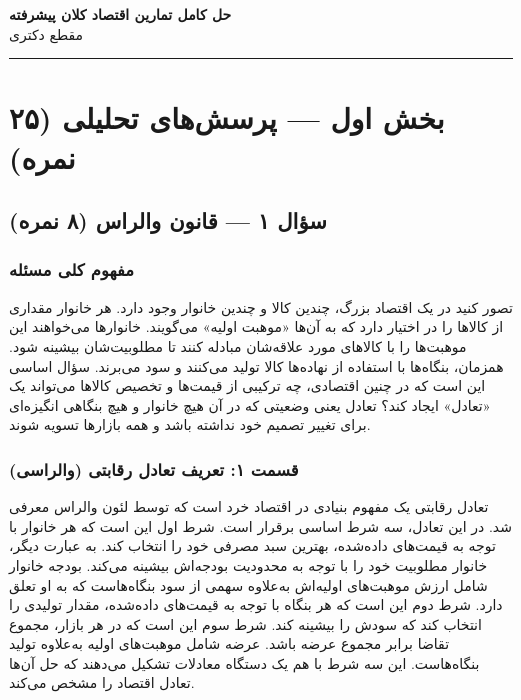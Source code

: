 \documentclass[12pt,a4paper]{article}
\begin{document}
\begin{center}
	{\Huge\bfseries\color{mainblue} حل کامل تمارین اقتصاد کلان پیشرفته}\\[0.5cm]
	{\large\color{darkgreen} مقطع دکتری}\\[0.3cm]
	{\color{mainblue}\rule{\textwidth}{1.5pt}}
\end{center}

\tableofcontents
\newpage

\section{بخش اول — پرسش‌های تحلیلی (۲۵ نمره)}

\subsection{سؤال ۱ — قانون والراس (۸ نمره)}

\subsubsection*{مفهوم کلی مسئله}

تصور کنید در یک اقتصاد بزرگ، چندین کالا و چندین خانوار وجود دارد. هر خانوار مقداری از کالاها را در اختیار دارد که به آن‌ها «موهبت اولیه» می‌گویند. خانوارها می‌خواهند این موهبت‌ها را با کالاهای مورد علاقه‌شان مبادله کنند تا مطلوبیت‌شان بیشینه شود. همزمان، بنگاه‌ها با استفاده از نهاده‌ها کالا تولید می‌کنند و سود می‌برند. سؤال اساسی این است که در چنین اقتصادی، چه ترکیبی از قیمت‌ها و تخصیص کالاها می‌تواند یک «تعادل» ایجاد کند؟ تعادل یعنی وضعیتی که در آن هیچ خانوار و هیچ بنگاهی انگیزه‌ای برای تغییر تصمیم خود نداشته باشد و همه بازارها تسویه شوند.

\subsubsection*{قسمت ۱: تعریف تعادل رقابتی (والراسی)}

تعادل رقابتی یک مفهوم بنیادی در اقتصاد خرد است که توسط لئون والراس معرفی شد. در این تعادل، سه شرط اساسی برقرار است. شرط اول این است که هر خانوار با توجه به قیمت‌های داده‌شده، بهترین سبد مصرفی خود را انتخاب کند. به عبارت دیگر، خانوار مطلوبیت خود را با توجه به محدودیت بودجه‌اش بیشینه می‌کند. بودجه خانوار شامل ارزش موهبت‌های اولیه‌اش به‌علاوه سهمی از سود بنگاه‌هاست که به او تعلق دارد. شرط دوم این است که هر بنگاه با توجه به قیمت‌های داده‌شده، مقدار تولیدی را انتخاب کند که سودش را بیشینه کند. شرط سوم این است که در هر بازار، مجموع تقاضا برابر مجموع عرضه باشد. عرضه شامل موهبت‌های اولیه به‌علاوه تولید بنگاه‌هاست. این سه شرط با هم یک دستگاه معادلات تشکیل می‌دهند که حل آن‌ها تعادل اقتصاد را مشخص می‌کند.
\end{document}
